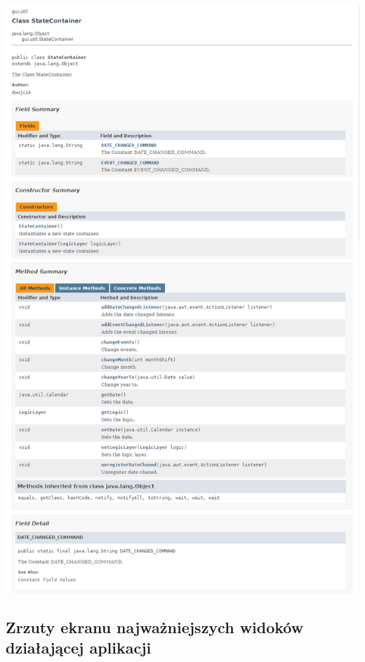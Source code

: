 \documentclass[a4paper,12pt]{article}
\begin{document}
\begin{minipage}{.75\textwidth}

    \includegraphics[width=\textwidth]{./screen/GUI/stateContainer.png}
    \label{MainViewLinux}

\end{minipage}

\subsection{Zrzuty ekranu najważniejszych widoków działającej aplikacji}
\end{document}
